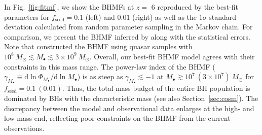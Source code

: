 \documentclass[twocolumn, twocolappendix]{aastex63}
\newcommand{\Msun}{M_\odot}
\newcommand{\Mbh}{M_\bullet}
\newcommand{\fseed}{f_\mathrm{seed}}
\newcommand{\D}{\mathrm{d}}
\begin{document}
\begin{CJK*}{UTF8}{gbsn}
In Fig.~\ref{fig:fitmf}, we show the BHMFs at $z=$ 6 reproduced by the best-fit parameters for 
$\fseed = 0.1$ (left) and $0.01$ (right) as well as
the $1\sigma$ standard deviation calculated from random parameter sampling in the Markov chain.
For comparison, we present the BHMF inferred by  along with the statistical errors.
Note that  constructed the BHMF using quasar samples with 
$10^8~\Msun \lesssim \Mbh \lesssim 3\times 10^9~\Msun$.
Overall, our best-fit BHMF model agrees with their constraints in this mass range.
The power-law index of the BHMF ($\gamma_{M_\bullet} \equiv \D \ln \Phi_{M_\bullet}/\D \ln M_\bullet$) is as steep as $\gamma_{M_\bullet}\lesssim -1$
at $M_\bullet \gtrsim 10^7~(3\times 10^7)~\Msun$ for $\fseed = 0.1 ~(0.01)$.
Thus, the total mass budget of the entire BH population is dominated by BHs with the characteristic mass (see also Section~\ref{sec:cosm}). 
The discrepancy between the model and observational data enlarges at the high- and low-mass end,
reflecting poor constraints on the BHMF from the current observations.



\end{CJK*}
\end{document}

